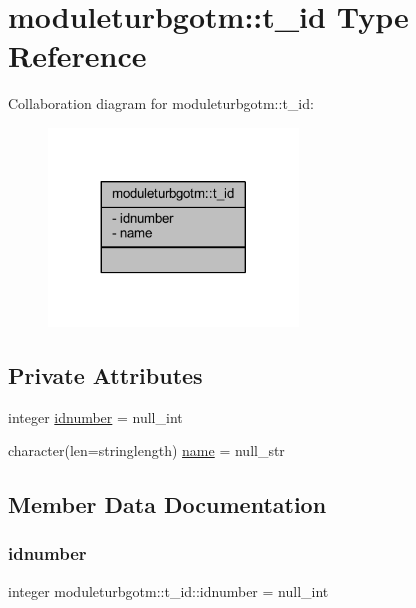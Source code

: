 \hypertarget{structmoduleturbgotm_1_1t__id}{}\section{moduleturbgotm\+:\+:t\+\_\+id Type Reference}
\label{structmoduleturbgotm_1_1t__id}


Collaboration diagram for moduleturbgotm\+:\+:t\+\_\+id\+:\nopagebreak
\begin{figure}[H]
\begin{center}
\leavevmode
\includegraphics[width=188pt]{structmoduleturbgotm_1_1t__id__coll__graph}
\end{center}
\end{figure}
\subsection*{Private Attributes}
\begin{DoxyCompactItemize}
\item 
integer \mbox{\hyperlink{structmoduleturbgotm_1_1t__id_a74ee7535f7eb91c42f3db0e1b8975500}{idnumber}} = null\+\_\+int
\item 
character(len=stringlength) \mbox{\hyperlink{structmoduleturbgotm_1_1t__id_ae9c0ad3170d08bf69d9c896ad478aa34}{name}} = null\+\_\+str
\end{DoxyCompactItemize}


\subsection{Member Data Documentation}
\mbox{\label{structmoduleturbgotm_1_1t__id_a74ee7535f7eb91c42f3db0e1b8975500}} 
\subsubsection{\texorpdfstring{idnumber}{idnumber}}
{\footnotesize\ttfamily integer moduleturbgotm\+::t\+\_\+id\+::idnumber = null\+\_\+int\hspace{0.3cm}{\ttfamily [private]}}

